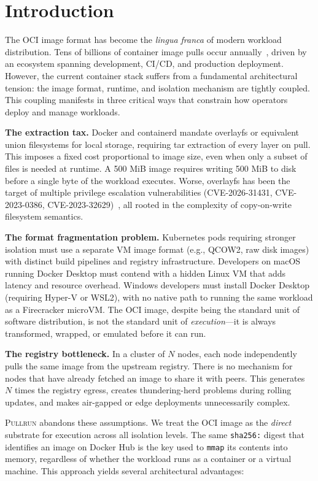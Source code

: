 \documentclass[11pt,a4paper]{article}
\newcommand{\pullrun}{\textsc{Pullrun}}
\newcommand{\mmap}{\texttt{mmap}}
\begin{document}
\section{Introduction}\label{sec:intro}

The OCI image format has become the \emph{lingua franca} of modern workload distribution. Tens of billions of container image pulls occur annually~\cite{dockerhub2024}, driven by an ecosystem spanning development, CI/CD, and production deployment. However, the current container stack suffers from a fundamental architectural tension: the image format, runtime, and isolation mechanism are tightly coupled. This coupling manifests in three critical ways that constrain how operators deploy and manage workloads.

\textbf{The extraction tax.} Docker and containerd mandate overlayfs or equivalent union filesystems for local storage, requiring tar extraction of every layer on pull. This imposes a fixed cost proportional to image size, even when only a subset of files is needed at runtime. A 500 MiB image requires writing 500 MiB to disk before a single byte of the workload executes. Worse, overlayfs has been the target of multiple privilege escalation vulnerabilities (CVE-2026-31431, CVE-2023-0386, CVE-2023-32629)~\cite{cvelist}, all rooted in the complexity of copy-on-write filesystem semantics.

\textbf{The format fragmentation problem.} Kubernetes pods requiring stronger isolation must use a separate VM image format (e.g., QCOW2, raw disk images) with distinct build pipelines and registry infrastructure. Developers on macOS running Docker Desktop must contend with a hidden Linux VM that adds latency and resource overhead. Windows developers must install Docker Desktop (requiring Hyper-V or WSL2), with no native path to running the same workload as a Firecracker microVM. The OCI image, despite being the standard unit of software distribution, is not the standard unit of \emph{execution}---it is always transformed, wrapped, or emulated before it can run.

\textbf{The registry bottleneck.} In a cluster of $N$ nodes, each node independently pulls the same image from the upstream registry. There is no mechanism for nodes that have already fetched an image to share it with peers. This generates $N$ times the registry egress, creates thundering-herd problems during rolling updates, and makes air-gapped or edge deployments unnecessarily complex.

\pullrun{} abandons these assumptions. We treat the OCI image as the \emph{direct} substrate for execution across all isolation levels. The same \texttt{sha256:} digest that identifies an image on Docker Hub is the key used to \mmap{} its contents into memory, regardless of whether the workload runs as a container or a virtual machine. This approach yields several architectural advantages:
\end{document}
